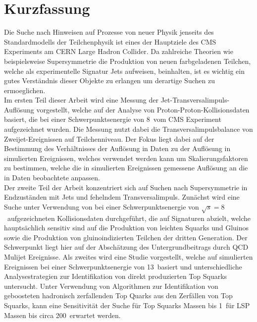 \section*{Kurzfassung}
Die Suche nach Hinweisen auf Prozesse von neuer Physik jenseits des Standardmodells der Teilchenphysik ist eines der Hauptziele des CMS Experiments am CERN Large Hadron Collider. Da zahlreiche Theorien wie beispielsweise Supersymmetrie die Produktion von neuen farbgeladenen Teilchen, welche als experimentelle Signatur Jets aufweisen, beinhalten, ist es wichtig ein gutes Verst\"andnis dieser Objekte zu erlangen um derartige Suchen zu ermoeglichen.\\
Im ersten Teil dieser Arbeit wird eine Messung der Jet-Transversalimpuls-Aufl\"osung vorgestellt, welche auf der Analyse von Proton-Proton-Kollisionsdaten basiert, die bei einer Schwerpunktsenergie von 8~\tev vom CMS Experiment aufgezeichnet wurden. Die Messung nutzt dabei die Transversalimpulsbalance von Zweijet-Ereignissen auf Teilchenniveau. Der Fokus liegt dabei auf der Bestimmung des Verh\"altnisses der Aufl\"osung in Daten zu der Aufl\"osung in simulierten Ereignissen, welches verwendet werden kann um Skalierungsfaktoren zu bestimmen, welche die in simulierten Ereignissen gemessene Aufl\"osung an die in Daten beobachtete anpassen.\\
Der zweite Teil der Arbeit konzentriert sich auf Suchen nach Supersymmetrie in Endzust\"anden mit Jets und fehelndem Transversalimpuls. Zun\"achst wird eine Suche unter Verwendung von bei einer Schwerpunktsenergie von $\sqrt{s}=8$~\tev aufgezeichneten Kollisionsdaten durchgef\"uhrt, die auf Signaturen abzielt, welche haupts\"achlich sensitiv sind auf die Produktion von leichten Squarks und Gluinos sowie die Produktion von gluinoindizierten Teilchen der dritten Generation. Der Schwerpunkt liegt hier auf der Absch\"atzung des Untergrundbeitrags durch QCD Mulijet Ereignisse. Als zweites wird eine Studie vorgestellt, welche auf simulierten Ereignissen bei einer Schwerpunktsenergie von 13~\tev basiert und unterschiedliche Analysestrategien zur Identifikation von direkt produzierten Top Squarks untersucht. Unter Verwendung von Algorithmen zur Identifikation von geboosteten hadronisch zerfallenden Top Quarks aus den Zerf\"allen von Top Squarks, kann eine Sensitivit\"at der Suche f\"ur Top Squarks Massen bis 1~\tev f\"ur LSP Massen bis circa 200~\gev erwartet werden.   